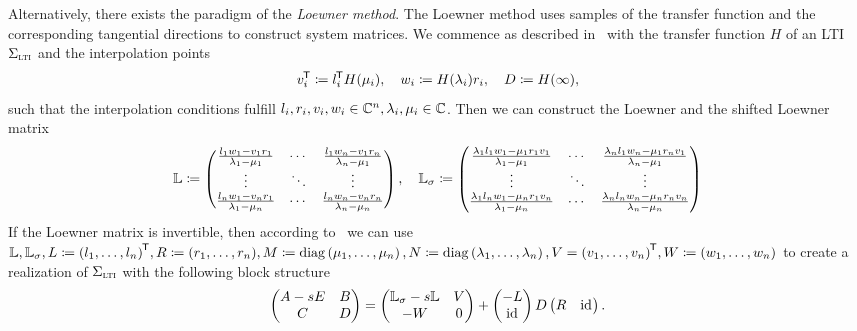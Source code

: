 Alternatively, there exists the paradigm of the \emph{Loewner method}.
The Loewner method uses samples of the transfer function and the corresponding tangential directions to construct system matrices.
We commence as described in~\cite{BGD2020} with the transfer function $H$ of an LTI $\Sigma_{\textnormal{\scshape lti}}$ and the interpolation points
\begin{equation*}
    v_i^{\mkern-1.5mu \mathsf{T}} \coloneqq  l_i^{\mkern-1.5mu \mathsf{T}} H(\mu_i),\quad w_i \coloneqq H(\lambda_i) r_i,\quad D\coloneqq H(\infty),
\end{equation*}
such that the interpolation conditions fulfill $l_i, r_i, v_i, w_i \in \mathbb{C}^n, \lambda_i, \mu_i \in \mathbb{C}$.
Then we can construct the Loewner and the shifted Loewner matrix
\begin{equation}\label{eq:loewner-matrices}
    \mathbb{L} \coloneqq \begin{pmatrix}
        \frac{l_1 w_1  - v_1 r_1}{\lambda_1 - \mu_1} & \cdots & \frac{l_1 w_n  - v_1 r_n}{\lambda_n - \mu_1} \\
        \vdots & \ddots & \vdots \\
        \frac{l_n w_1  - v_n r_1}{\lambda_1 - \mu_n} & \cdots & \frac{l_n w_n  - v_n r_n}{\lambda_n - \mu_n}
    \end{pmatrix},\quad \mathbb{L}_\sigma \coloneqq \begin{pmatrix}
        \frac{\lambda_1 l_1 w_1 - \mu_1 r_1 v_1}{\lambda_1 - \mu_1} & \cdots & \frac{\lambda_n l_1 w_n - \mu_1 r_n v_1}{\lambda_n - \mu_1} \\
        \vdots & \ddots & \vdots \\
        \frac{\lambda_1 l_n w_1 - \mu_n r_1 v_n}{\lambda_1 - \mu_n} & \cdots & \frac{\lambda_n l_n w_n - \mu_n r_n v_n}{\lambda_n - \mu_n}
    \end{pmatrix}
\end{equation}
If the Loewner matrix is invertible, then according to~\cite[Theorem~5.1]{BGD2020} we can use $\mathbb{L}, \mathbb{L}_\sigma, L \coloneqq {(l_1, \dots, l_n)}^{\mkern-1.5mu \mathsf{T}}, R \coloneqq (r_1, \dots, r_n), M \coloneqq \mathop{}\!\mathrm{diag}\left(\mu_1, \dots, \mu_n\right), N \coloneqq \mathop{}\!\mathrm{diag}\left(\lambda_1, \dots, \lambda_n\right), V = {(v_1, \dots, v_n)}^{\mkern-1.5mu \mathsf{T}}, W \coloneqq (w_1, \dots, w_n)$ to create a realization of $\Sigma_{\textnormal{\scshape lti}}$ with the following block structure
\begin{equation}\label{eq:loewner-realization}
    \begin{pmatrix}
        A - sE & B \\
        C & D
    \end{pmatrix} = \begin{pmatrix}
        \mathbb{L}_\sigma - s \mathbb{L} & V \\
        -W & 0
    \end{pmatrix} + \begin{pmatrix}
        -L \\
        \text{id}_{}
    \end{pmatrix} D \begin{pmatrix}
        R & \text{id}_{}
    \end{pmatrix}.
\end{equation}
